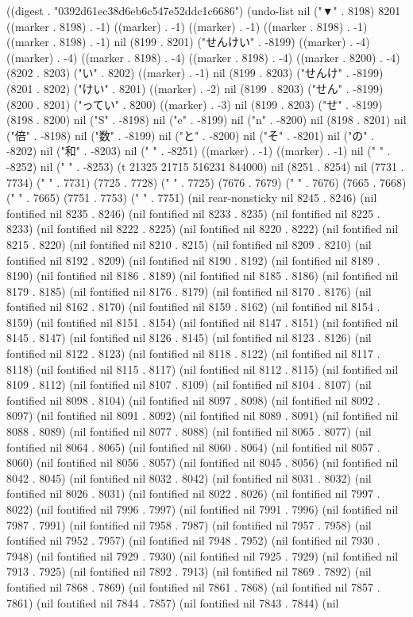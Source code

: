
((digest . "0392d61ec38d6eb6c547e52ddc1c6686") (undo-list nil ("▼" . 8198) 8201 ((marker . 8198) . -1) ((marker) . -1) ((marker) . -1) ((marker . 8198) . -1) ((marker . 8198) . -1) nil (8199 . 8201) ("せんけい" . -8199) ((marker) . -4) ((marker) . -4) ((marker . 8198) . -4) ((marker . 8198) . -4) ((marker . 8200) . -4) (8202 . 8203) ("い" . 8202) ((marker) . -1) nil (8199 . 8203) ("せんけ" . -8199) (8201 . 8202) ("けい" . 8201) ((marker) . -2) nil (8199 . 8203) ("せん" . -8199) (8200 . 8201) ("ってい" . 8200) ((marker) . -3) nil (8199 . 8203) ("せ" . -8199) (8198 . 8200) nil ("S" . -8198) nil ("e" . -8199) nil ("n" . -8200) nil (8198 . 8201) nil ("倍" . -8198) nil ("数" . -8199) nil ("と" . -8200) nil ("そ" . -8201) nil ("の" . -8202) nil ("和" . -8203) nil ("
" . -8251) ((marker) . -1) ((marker) . -1) nil (" " . -8252) nil (" " . -8253) (t 21325 21715 516231 844000) nil (8251 . 8254) nil (7731 . 7734) ("  " . 7731) (7725 . 7728) ("  " . 7725) (7676 . 7679) ("  " . 7676) (7665 . 7668) ("  " . 7665) (7751 . 7753) (" " . 7751) (nil rear-nonsticky nil 8245 . 8246) (nil fontified nil 8235 . 8246) (nil fontified nil 8233 . 8235) (nil fontified nil 8225 . 8233) (nil fontified nil 8222 . 8225) (nil fontified nil 8220 . 8222) (nil fontified nil 8215 . 8220) (nil fontified nil 8210 . 8215) (nil fontified nil 8209 . 8210) (nil fontified nil 8192 . 8209) (nil fontified nil 8190 . 8192) (nil fontified nil 8189 . 8190) (nil fontified nil 8186 . 8189) (nil fontified nil 8185 . 8186) (nil fontified nil 8179 . 8185) (nil fontified nil 8176 . 8179) (nil fontified nil 8170 . 8176) (nil fontified nil 8162 . 8170) (nil fontified nil 8159 . 8162) (nil fontified nil 8154 . 8159) (nil fontified nil 8151 . 8154) (nil fontified nil 8147 . 8151) (nil fontified nil 8145 . 8147) (nil fontified nil 8126 . 8145) (nil fontified nil 8123 . 8126) (nil fontified nil 8122 . 8123) (nil fontified nil 8118 . 8122) (nil fontified nil 8117 . 8118) (nil fontified nil 8115 . 8117) (nil fontified nil 8112 . 8115) (nil fontified nil 8109 . 8112) (nil fontified nil 8107 . 8109) (nil fontified nil 8104 . 8107) (nil fontified nil 8098 . 8104) (nil fontified nil 8097 . 8098) (nil fontified nil 8092 . 8097) (nil fontified nil 8091 . 8092) (nil fontified nil 8089 . 8091) (nil fontified nil 8088 . 8089) (nil fontified nil 8077 . 8088) (nil fontified nil 8065 . 8077) (nil fontified nil 8064 . 8065) (nil fontified nil 8060 . 8064) (nil fontified nil 8057 . 8060) (nil fontified nil 8056 . 8057) (nil fontified nil 8045 . 8056) (nil fontified nil 8042 . 8045) (nil fontified nil 8032 . 8042) (nil fontified nil 8031 . 8032) (nil fontified nil 8026 . 8031) (nil fontified nil 8022 . 8026) (nil fontified nil 7997 . 8022) (nil fontified nil 7996 . 7997) (nil fontified nil 7991 . 7996) (nil fontified nil 7987 . 7991) (nil fontified nil 7958 . 7987) (nil fontified nil 7957 . 7958) (nil fontified nil 7952 . 7957) (nil fontified nil 7948 . 7952) (nil fontified nil 7930 . 7948) (nil fontified nil 7929 . 7930) (nil fontified nil 7925 . 7929) (nil fontified nil 7913 . 7925) (nil fontified nil 7892 . 7913) (nil fontified nil 7869 . 7892) (nil fontified nil 7868 . 7869) (nil fontified nil 7861 . 7868) (nil fontified nil 7857 . 7861) (nil fontified nil 7844 . 7857) (nil fontified nil 7843 . 7844) (nil 